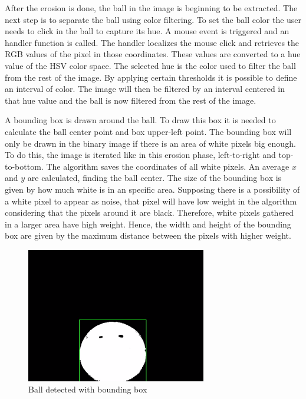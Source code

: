 After the erosion is done, the ball in the image is beginning to be extracted. The next step is to separate the ball using color filtering. To set the ball color the user needs to click in the ball to capture its hue. A mouse event is triggered and an handler function is called. The handler localizes the mouse click and retrieves the RGB values of the pixel in those coordinates. These values are converted to a hue value of the HSV color space. The selected hue is the color used to filter the ball from the rest of the image. By applying certain thresholds it is possible to define an interval of color. The image will then be filtered by an interval centered in that hue value and the ball is now filtered from the rest of the image. 

A bounding box is drawn around the ball. To draw this box it is needed to calculate the ball center point and box upper-left point. The bounding box will only be drawn in the binary image if there is an area of white pixels big enough. To do this, the image is iterated like in this erosion phase, left-to-right and top-to-bottom. The algorithm saves the coordinates of all white pixels. An average $x$ and $y$ are calculated, finding the ball center. The size of the bounding box is given by how much white is in an specific area. Supposing there is a possibility of a white pixel to appear as noise, that pixel will have low weight in the algorithm considering that the pixels around it are black. Therefore, white pixels gathered in a larger area have high weight. Hence, the width and height of the bounding box are given by the maximum distance between the pixels with higher weight.


\begin{figure}[htp]
	
	\centering
	\includegraphics[width=0.7\textwidth]{capcalib/imgs/ball_detect.png}
	
	\caption{Ball detected with bounding box}
	\label{fig:balldetect}
	
\end{figure}

